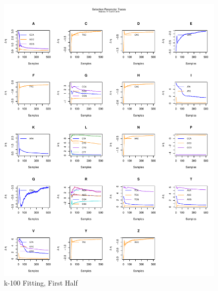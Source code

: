 \documentclass[11pt]{labbook}
\begin{document}
    \begin{figure}
        \centering
        \includegraphics[scale=.65]{FONSE_Plots/2016/December_14/k-100_selection500}
        \caption{k-100 Fitting, First Half}
        \label{fig:k-100_1SEL}
    \end{figure}
\end{document}
